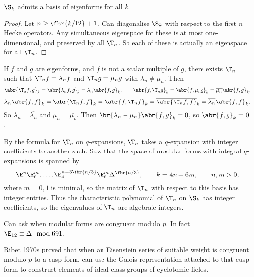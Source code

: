 \begin{corollary}
$ \S_k $ admits a basis of eigenforms for all $ k $.
\end{corollary}

\begin{proof}
Let $ n \ge \fbr{k / 12} + 1 $. Can diagonalise $ \S_k $ with respect to the first $ n $ Hecke operators. Any simultaneous eigenspace for these is at most one-dimensional, and preserved by all $ \T_n $. So each of these is actually an eigenspace for all $ \T_n $.
\end{proof}

\pagebreak


\begin{note*}
If $ f $ and $ g $ are eigenforms, and $ f $ is not a scalar multiple of $ g $, there exists $ \T_n $ such that $ \T_nf = \lambda_nf $ and $ \T_ng = \mu_ng $ with $ \lambda_n \ne \mu_n $. Then
$$ \abr{\T_nf, g}_k = \abr{\lambda_nf, g}_k = \lambda_n\abr{f, g}_k, \qquad \abr{f, \T_ng}_k = \abr{f, \mu_ng}_k = \overline{\mu_n}\abr{f, g}_k, $$
$$ \lambda_n\abr{f, f}_k = \abr{\T_nf, f}_k = \abr{f, \T_nf}_k = \overline{\abr{\T_nf, f}}_k = \overline{\lambda_n}\abr{f, f}_k. $$
So $ \lambda_n = \overline{\lambda_n} $ and $ \mu_n = \overline{\mu_n} $. Then $ \br{\lambda_n - \mu_n}\abr{f, g}_k = 0 $, so $ \abr{f, g}_k = 0 $.
\end{note*}

By the formula for $ \T_n $ on $ q $-expansions, $ \T_n $ takes a $ q $-expansion with integer coefficients to another such. Saw that the space of modular forms with integral $ q $-expansions is spanned by
$$ \E_4^n\E_6^m, \dots, \E_4^{n - 3\fbr{n / 3}}\E_6^m\Delta^{\fbr{n / 3}}, \qquad k = 4n + 6m, \qquad n, m > 0, $$
where $ m = 0, 1 $ is minimal, so the matrix of $ \T_n $ with respect to this basis has integer entries. Thus the characteristic polynomial of $ \T_n $ on $ \S_k $ has integer coefficients, so the eigenvalues of $ \T_n $ are algebraic integers.

\begin{example*}
Can ask when modular forms are congruent modulo $ p $. In fact $ \E_{12} \equiv \Delta \mod 691 $.
\end{example*}

Ribet 1970s proved that when an Eisenstein series of suitable weight is congruent modulo $ p $ to a cusp form, can use the Galois representation attached to that cusp form to construct elements of ideal class groups of cyclotomic fields.

